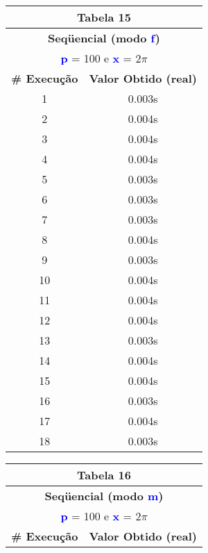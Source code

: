 \documentclass[11pt]{article}
\begin{document}
\begin{table}[!h]
	\begin{center}
		\begin{minipage}{0.48\textwidth}
			\begin{tabular}{| c | c |}
			\hline
			\multicolumn{2}{|c|}{\textbf{Tabela 15}} \\ \hline
			\multicolumn{2}{|c|}{\textbf{Seqüencial (modo \textbf{\textcolor{blue}{f}})}} \\
			\multicolumn{2}{|c|}{\textbf{\textcolor{blue}{p}} = 100 e \textbf{\textcolor{blue}{x}} = $2\pi$} \\ [0.2ex]
			\hline
				\textbf{\# Execução} &  \textbf{Valor Obtido (real)} \\ \hline
				1 & 0.003s \\ \hline
				2 & 0.004s \\ \hline
				3 & 0.004s \\ \hline
				4 & 0.004s \\ \hline
				5 & 0.003s \\ \hline
				6 & 0.003s \\ \hline
				7 & 0.003s \\ \hline
				8 & 0.004s \\ \hline
				9 & 0.003s \\ \hline
				10 & 0.004s \\ \hline
				11 & 0.004s \\ \hline
				12 & 0.004s \\ \hline
				13 & 0.003s \\ \hline
				14 & 0.004s \\ \hline
				15 & 0.004s \\ \hline
				16 & 0.003s \\ \hline
				17 & 0.004s \\ \hline
				18 & 0.003s \\ \hline
			\end{tabular}
		\end{minipage}
		\begin{minipage}{0.48\textwidth}
			\begin{tabular}{| c | c |}
			\hline
			\multicolumn{2}{|c|}{\textbf{Tabela 16}} \\ \hline
			\multicolumn{2}{|c|}{\textbf{Seqüencial (modo \textbf{\textcolor{blue}{m}})}} \\
			\multicolumn{2}{|c|}{\textbf{\textcolor{blue}{p}} = 100 e \textbf{\textcolor{blue}{x}} = $2\pi$} \\ [0.2ex]
			\hline
				\textbf{\# Execução} &  \textbf{Valor Obtido (real)} \\ \hline

\end{tabular}
\end{minipage}
\end{center}
\end{table}
\end{document}
